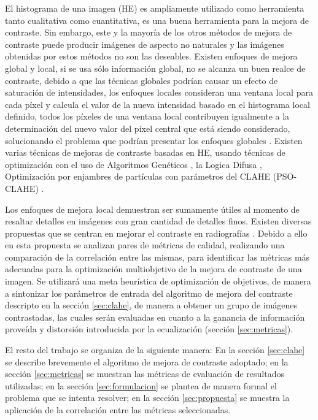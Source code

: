 \documentclass[spanish,twocolumn]{article}
\begin{document}
El histograma de una imagen (HE) \cite{poddar2013non} es ampliamente utilizado como herramienta tanto cualitativa como cuantitativa, es una buena herramienta para la mejora de contraste. Sin embargo, este y la mayoría de los otros métodos de mejora de contraste puede producir imágenes de aspecto no naturales y las imágenes obtenidas por estos métodos no son las deseables. Existen enfoques de mejora global y local, si se usa sólo información global, no se alcanza un buen realce de contraste, debido a que las técnicas globales podrían causar un efecto de saturación de intensidades, los enfoques locales consideran una ventana local para cada píxel y calcula el valor de la nueva intensidad basado en el histograma local definido, todos los píxeles de una ventana local contribuyen igualmente a la determinación del nuevo valor del píxel central que está siendo considerado, solucionando el problema que podrían presentar los enfoques globales \cite{yu2004fast}. Existen varias técnicas de mejoras de contraste basadas en HE, usando técnicas de optimización con el uso de Algoritmos Genéticos \cite{hashemi2010image}, la Logica Difusa \cite{jenifer2016contrast}, Optimización por enjambres de partículas con parámetros del CLAHE (PSO-CLAHE) \cite{morebrizuela2014}.
 
Los enfoques de mejora local demuestran ser sumamente útiles al momento de resaltar detalles en imágenes con gran cantidad de detalles finos. Existen diversas propuestas que se centran en mejorar el contraste en radiografías \cite{1625082,4712472,5360176}. Debido a ello en esta propuesta se analizan pares de métricas de calidad, realizando una comparación de la correlación entre las mismas, para identificar las métricas más adecuadas para la optimización multiobjetivo de la mejora de contraste de una imagen. 
Se utilizará una meta heurística de optimización de objetivos, de manera a sintonizar los parámetros de entrada del algoritmo de mejora del contraste descripto en la sección \ref{sec:clahe}, de manera a obtener un grupo de imágenes contrastadas, las cuales serán evaluadas en cuanto a la ganancia de información proveída y distorsión introducida por la ecualización (sección \ref{sec:metricas}).

El resto del trabajo se organiza de la siguiente manera: En la sección \ref{sec:clahe} se describe brevemente el algoritmo de mejora de contraste adoptado; en la sección \ref{sec:metricas} se muestran las métricas de evaluación de resultados utilizadas; en la sección \ref{sec:formulacion} se plantea de manera formal el problema que se intenta resolver; en la sección \ref{sec:propuesta} se muestra la aplicación de la correlación entre las métricas seleccionadas. %
\end{document}
